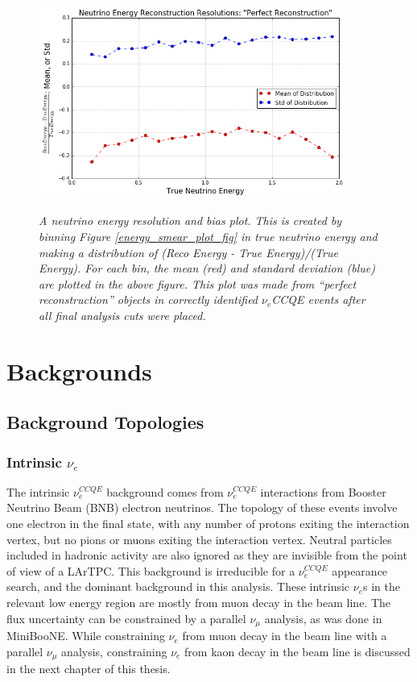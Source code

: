 \begin{figure}[ht!]
\centering
\includegraphics[width=0.9\textwidth]{Figures/LEE_EnergyRes_WithAnalysisCuts.png}\\%
\caption{\textit{A neutrino energy resolution and bias plot. This is created by binning Figure \ref{energy_smear_plot_fig} in true neutrino energy and making a distribution of (Reco Energy - True Energy)/(True Energy). For each bin, the mean (red) and standard deviation (blue) are plotted in the above figure. This plot was made from ``perfect reconstruction'' objects in correctly identified $\nu_e$CCQE events after all final analysis cuts were placed.}}
\label{energy_res_plot_fig}
\end{figure}

\section{Backgrounds}

\subsection{Background Topologies}\label{LEEbackgroundtopologiessection}

\subsubsection{Intrinsic $\nu_e$}
The intrinsic $\nu_e^{CCQE}$ background comes from $\nu_e^{CCQE}$ interactions from Booster Neutrino Beam (BNB) electron neutrinos. The topology of these events involve one electron in the final state, with any number of protons exiting the interaction vertex, but no pions or muons exiting the interaction vertex. Neutral particles included in hadronic activity are also ignored as they are invisible from the point of view of a LArTPC. This background is irreducible for a $\nu_e^{CCQE}$ appearance search, and the dominant background in this analysis. These intrinsic $\nu_e$s in the relevant low energy region are mostly from muon decay in the beam line. The flux uncertainty can be constrained by a parallel $\nu_\mu$ analysis, as was done in MiniBooNE. While constraining $\nu_e$ from muon decay in the beam line with a parallel $\nu_\mu$ analysis, constraining $\nu_e$ from kaon decay in the beam line is discussed in the next chapter of this thesis.

